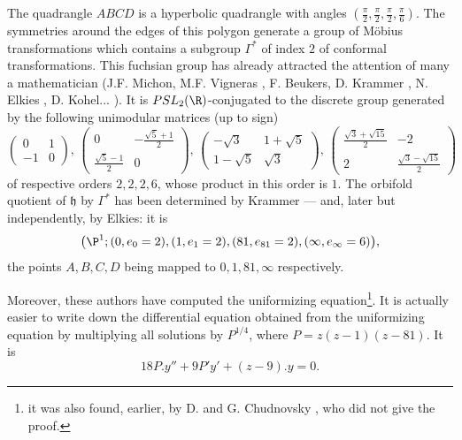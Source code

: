 \begin{para}
\medskip The quadrangle $ABCD$ is a hyperbolic quadrangle with angles
 $(\frac{\pi}{2},\frac{\pi}{2},\frac{\pi}{2},\frac{\pi}{6})$. The
 symmetries around the edges of this polygon generate a group of
 M\"obius transformations which contains a 
 subgroup $\Gamma^\ast$ of index $2$ of conformal transformations. This
 fuchsian group has already attracted the attention 
 of many a mathematician (J.F. Michon, M.F. Vigneras
 \cite[p. 123]{adadq}, F. Beukers, D. Krammer \cite{aeoaafg}, N. Elkies 
 \cite{elkies98:_shimur}, D. Kohel... ). It is $PSL_2(\R)$-conjugated to the 
 discrete group generated by the following unimodular 
matrices (up to sign)
\begin{equation*}
\begin{pmatrix}
 0&1\\-1&0
\end{pmatrix},\,
\begin{pmatrix}
 0&-\frac{\sqrt 5+1}{2}\\
 \frac{\sqrt 5-1}{2}&0
\end{pmatrix},\,
\begin{pmatrix}
 -\sqrt 3& 1+\sqrt 5 \\ 1-\sqrt 5&\sqrt 3
\end{pmatrix},\,
\begin{pmatrix}
 \frac{\sqrt 3+\sqrt {15}}{2}& -2\\2&\frac{\sqrt 3-\sqrt {15}}{2}
\end{pmatrix}
\end{equation*}
of respective orders $2,2,2,6$, whose product in this order is $1$. The
 orbifold quotient of $\mathfrak{h}$ by $\Gamma^\ast$ has 
been determined by Krammer --- and, later but independently, by Elkies: it is 
\begin{equation*}
\bigl(\P^1; (0,e_0=2), (1,e_1=2), (81, e_{81}=2), (\infty , e_\infty =
 6)\bigr),
\end{equation*}
 the points $A,B,C,D$ being mapped to $0,1,81,\infty$ respectively. 

Moreover, these authors have computed the uniformizing
equation\footnote{it was also found, earlier, by D. and G. Chudnovsky 
\cite[p.193]{chudnovsky89:_comput}, who did not give 
the proof.}. It is actually easier to write down the differential 
equation obtained from the uniformizing equation by 
multiplying all solutions by $P^{1/4}$, where $P=z(z-1)(z-81)$.  It is 
\begin{equation*}
 18P. y'' + 9 P' y' + (z-9). y =0.\tag{$\ast$}
\end{equation*}
\end{para}


